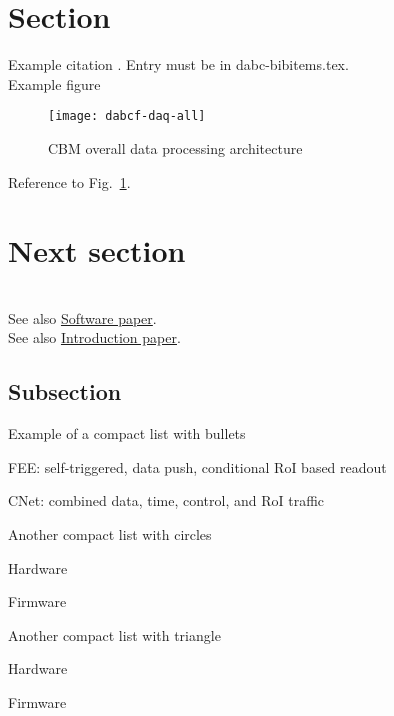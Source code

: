 \section{Section}

Example citation \cite{CBM-stat-rep}. Entry must be in
dabc-bibitems.tex.\\ %

Example figure
\begin{figure}[htb]
\centering\texttt{[image: dabcf-daq-all]} %
\caption{CBM overall data processing architecture}
\label{fig:XXX-fig} %
\end{figure}


Reference to Fig.~\ref{fig:XXX-fig}.
\clearpage %

\section{Next section}

\\
See also \hyperref{http://www-linux.gsi.de/~mbs/main-software.pdf}{sw}{data}{Software paper}.\\
See also \hyperref{http://www-linux.gsi.de/~mbs/main-intro.pdf}{in}{mission}{Introduction paper}.

\subsection{Subsection}

Example of a compact list with bullets
\bbul
\item FEE: self-triggered, data push, conditional RoI based readout
\item CNet: combined data, time, control, and RoI traffic
\ebul

Another compact list with circles
\bcir
\item Hardware
\item Firmware
\ecir

Another compact list with triangle
\btri
\item Hardware
\item Firmware
\etri

